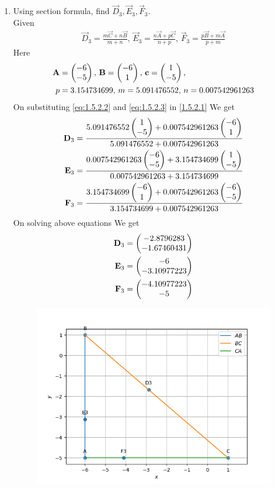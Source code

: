 \documentclass[11pt]{book}
\begin{document}
\begin{enumerate}[label=\thesection.\arabic*.,ref=\thesection.\theenumi]
\item Using section formula, find $\vec{D}_3, \vec{E}_3, \vec{F}_3$. \\
\solution Given
\begin{align}
			\vec{D}_3 = \frac{m\vec{C}+n\vec{B}}{m+n},\,
			\vec{E}_3 = \frac{n\vec{A}+p\vec{C}}{n+p},\,
			\vec{F}_3 = \frac{p\vec{B}+m\vec{A}}{p+m} \label{eq:1.5.2.1}
\end{align}
Here
\begin{align}
	\vec{A} &= \myvec{-6 \\ -5},\,
	\vec{B} = \myvec{-6\\1},\,
	\vec{c} = \myvec{1\\-5},\, \label{eq:1.5.2.2} \\
	p &= 3.154734699,\,
	m = 5.091476552,\,
	n = 0.007542961263  \label{eq:1.5.2.3}
\end{align}
On substituting \eqref{eq:1.5.2.2} and \eqref{eq:1.5.2.3} in \eqref{1.5.2.1} We get
\begin{align}
    \mathbf{D}_3 &= \frac{5.091476552\begin{pmatrix}1 \\ -5\end{pmatrix} + 0.007542961263\begin{pmatrix}-6\\1\end{pmatrix}}{5.091476552+0.007542961263 } \\
    \mathbf{E}_3 &= \frac{0.007542961263\begin{pmatrix}-6 \\ -5\end{pmatrix} + 3.154734699\begin{pmatrix}1\\-5\end{pmatrix}}{0.007542961263+3.154734699} \\
    \mathbf{F}_3 &= \frac{3.154734699\begin{pmatrix}-6 \\ 1\end{pmatrix} + 0.007542961263\begin{pmatrix}-6\\-5\end{pmatrix}}{3.154734699+0.007542961263}
\end{align}
On solving above equations We get 
\begin{align}
    \mathbf{D}_3 &= \begin{pmatrix}-2.8796283  \\ -1.67460431\end{pmatrix} \\
    \mathbf{E}_3 &= \begin{pmatrix}-6  \\ -3.10977223\end{pmatrix} \\
    \mathbf{F}_3 &= \begin{pmatrix}-4.10977223  \\ -5\end{pmatrix} 
\end{align}
\begin{figure}[H]
\includegraphics[width=\columnwidth]{figs/Points.png}

\end{figure}
\end{enumerate}
\end{document}
